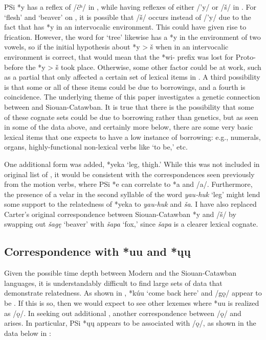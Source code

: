 \documentclass[output=paper]{LSP/langsci}
\begin{document}
PSi *y has a reflex of /\v{c}ʰ/ in , while having reflexes of either /'y/ or /\v{s}/ in . For `flesh' and `beaver' on , it is possible that  /\v{s}/ occurs instead of /'y/ due to the fact that  has *y in an intervocalic environment. This could have given rise to frication. However, the word for `tree' likewise has a *y in the environment of two vowels, so if the initial hypothesis about *y > \v{s} when in an intervocalic environment is correct, that would mean that the *wi- prefix was lost for Proto- before the *y > \v{s}  took place. Otherwise, some other factor could be at work, such as a partial  that only affected a certain set of lexical items in . A third possibility is that some or all of these items could be due to borrowings, and a fourth is coincidence. The underlying theme of this paper investigates a genetic connection between  and Siouan-Catawban. It is true that there is the possibility that some of these cognate sets could be due to borrowing rather than genetics, but as seen in some of the data above, and certainly more below, there are some very basic lexical items that one expects to have a low instance of borrowing: e.g., numerals, organs, highly-functional non-lexical verbs like `to be,' etc. 

One additional  form was added, *yeka `leg, thigh.' While this was not included in  original list of , it would be consistent with the correspondences seen previously from the motion verbs, where PSi *e can correlate to  *a and  /a/. Furthermore, the presence of a velar in the second syllable of the  word \emph{yau-huk} `leg' might lend some support to the relatedness of *yeka to  \emph{yau-huk} and  \emph{\v{s}a}. I have also replaced Carter's original correspondence between Siouan-Catawban *y and  /\v{s}/ by swapping out \emph{\v{s}ag\k{e}} `beaver' with \emph{\v{s}apa} `fox,' since \emph{\v{s}apa} is a clearer lexical cognate.

\subsection{Correspondence with  *uu and *\k{u}\k{u}}

Given the possible time depth between Modern  and the Siouan-Catawban languages, it is understandably difficult to find large sets of data that demonstrate relatedness. As shown in , *k\'uu `come back here' and  /g\k{o}/ appear to be . If this is so, then we would expect to see other lexemes where *uu is realized as /\k{o}/. In seeking out additional , another correspondence between  /\k{o}/ and  arises. In particular, PSi *\k{u}\k{u} appears to be associated with /\k{o}/, as shown in the data below in :
\end{document}

